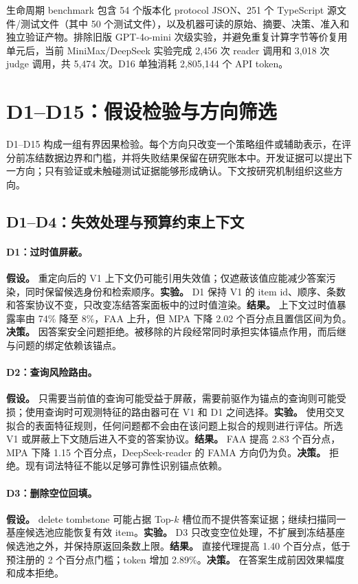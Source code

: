 生命周期 benchmark 包含 54 个版本化 protocol JSON、251 个 TypeScript 源文件/测试文件（其中 50 个测试文件），以及机器可读的原始、摘要、决策、准入和独立验证产物。排除旧版 GPT-4o-mini 次级实验，并避免重复计算字节等价复用单元后，当前 MiniMax/DeepSeek 实验完成 2,456 次 reader 调用和 3,018 次 judge 调用，共 5,474 次。D16 单独消耗 2,805,144 个 API token。

\section{D1--D15：假设检验与方向筛选}
\label{sec:d1d15}

D1--D15 构成一组有界因果检验。每个方向只改变一个策略组件或辅助表示，在评分前冻结数据边界和门槛，并将失败结果保留在研究账本中。开发证据可以提出下一方向；只有验证或未触碰测试证据能够形成确认。下文按研究机制组织这些方向。

\subsection{D1--D4：失效处理与预算约束上下文}

\paragraph{D1：过时值屏蔽。}
\textbf{假设。} 重定向后的 V1 上下文仍可能引用失效值；仅遮蔽该值应能减少答案污染，同时保留候选身份和检索顺序。\textbf{实验。} D1 保持 V1 的 item id、顺序、条数和答案协议不变，只改变冻结答案面板中的过时值渲染。\textbf{结果。} 上下文过时值暴露率由 74\% 降至 8\%，FAA 上升，但 MPA 下降 2.02 个百分点且置信区间为负。\textbf{决策。} 因答案安全问题拒绝。被移除的片段经常同时承担实体锚点作用，而后继与问题的绑定依赖该锚点。

\paragraph{D2：查询风险路由。}
\textbf{假设。} 只需要当前值的查询可能受益于屏蔽，需要前驱作为锚点的查询则可能受损；使用查询时可观测特征的路由器可在 V1 和 D1 之间选择。\textbf{实验。} 使用交叉拟合的表面特征规则，任何问题都不会由在该问题上拟合的规则进行评估。所选 V1 或屏蔽上下文随后进入不变的答案协议。\textbf{结果。} FAA 提高 2.83 个百分点，MPA 下降 1.15 个百分点，DeepSeek-reader 的 FAMA 方向仍为负。\textbf{决策。} 拒绝。现有词法特征不能以足够可靠性识别锚点依赖。

\paragraph{D3：删除空位回填。}
\textbf{假设。} delete tombstone 可能占据 Top-$k$ 槽位而不提供答案证据；继续扫描同一基座候选池应能恢复有效 item。\textbf{实验。} D3 只改变空位处理，不扩展到冻结基座候选池之外，并保持原返回条数上限。\textbf{结果。} 直接代理提高 1.40 个百分点，低于预注册的 2 个百分点门槛；token 增加 2.89\%。\textbf{决策。} 在答案生成前因效果幅度和成本拒绝。

